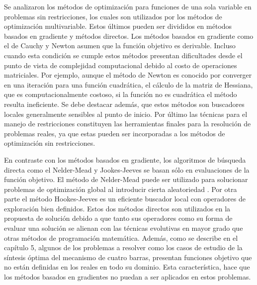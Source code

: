 Se analizaron los métodos de optimización para funciones de una sola variable en problemas sin restricciones, los cuales son utilizados por los métodos de optimización multivariable. Estos últimos pueden ser divididos en métodos basados en gradiente y métodos directos. Los métodos basados en gradiente como el de Cauchy y Newton asumen que la función objetivo es derivable. Incluso cuando esta condición se cumple estos métodos presentan dificultades desde el punto de vista de complejidad computacional debido al costo de operaciones matriciales. Por ejemplo, aunque el método de Newton es conocido por converger en una iteración para una función cuadrática, el cálculo de la matriz de Hessiana, que es computacionalmente costoso, si la función no es cuadrática el método resulta ineficiente. Se debe destacar además, que estos métodos son buscadores locales generalmente sensibles al punto de inicio. Por último las técnicas para el manejo de restricciones constituyen las herramientas finales para la resolución de problemas reales,  ya que estas pueden ser incorporadas a los métodos de optimización sin restricciones.

En contraste con los métodos basados en gradiente, los algoritmos de búsqueda directa como el Nelder-Mead y Jookes-Jeeves se basan sólo en evaluaciones de la función objetivo. El método de Nelder-Mead puede ser utilizado para solucionar problemas de optimización global al introducir cierta aleatoriedad \cite{belegundu_optimization_2011}. Por otra parte el método Hookes-Jeeves es un eficiente buscador local con operadores de exploración bien definidos. Estos dos métodos directos son utilizados en la propuesta de solución debido a que tanto sus operadores como su forma de evaluar una solución se alienan con las técnicas evolutivas en mayor grado que otras métodos de programación matemática. Además, como se describe en el capítulo 5, algunos de los problemas a resolver como los casos de estudio de la síntesis óptima del mecanismo de cuatro barras, presentan funciones objetivo que no están definidas en los reales en todo su dominio. Esta característica, hace que los métodos basados en gradientes no puedan a ser aplicados en estos problemas. 